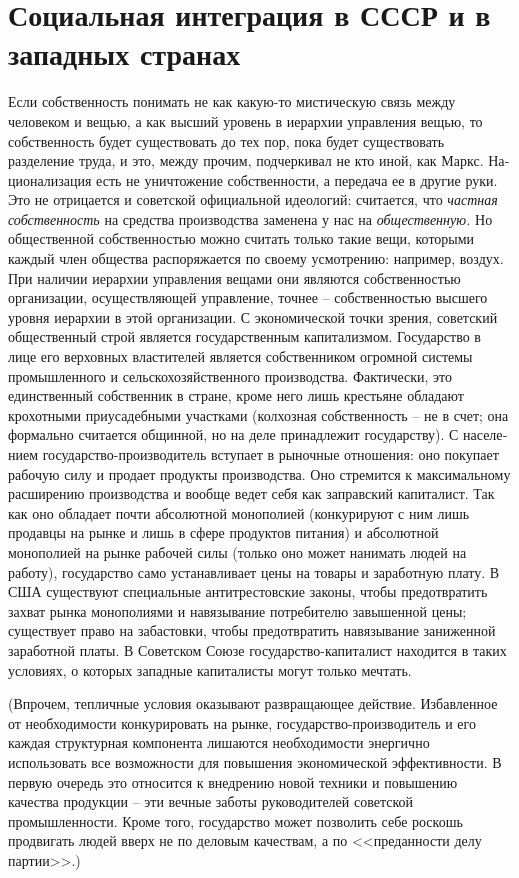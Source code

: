 \documentclass{book}
\begin{document}
\section{Социальная интеграция в СССР и в западных странах}

Если собственность понимать не как какую-то мистическую связь между человеком и вещью, а как высший уровень в ие­рархии управления вещью, то собственность будет существо­вать до тех пор, пока будет существовать разделение труда, и это, между прочим, подчеркивал не кто иной, как Маркс. На­ционализация есть не уничтожение собственности, а передача ее в другие руки. Это не отрицается и советской официальной идеологий: считается, что \textit{частная собственность}  на средства производства заменена у нас на \textit{общественную.}  Но общественной собственностью можно считать только такие вещи, кото­рыми каждый член общества распоряжается по своему усмот­рению: например, воздух. При наличии иерархии управления вещами они являются собственностью организации, осущест­вляющей управление, точнее -- собственностью высшего уров­ня иерархии в этой организации. С экономической точки зре­ния, советский общественный строй является государственным капитализмом. Государство в лице его верховных властите­лей является 
собственником огромной 
системы промышлен­ного и сельскохозяйственного производства. Фактически, это единственный собственник в стране, кроме него лишь кре­стьяне обладают крохотными приусадебными участками (кол­хозная собственность -- не в счет; она формально считается общинной, но на деле принадлежит государству). С населе­нием государство-производитель вступает в рыночные отно­шения: оно покупает рабочую силу и продает продукты произ­водства. Оно стремится к максимальному расширению произ­водства и вообще ведет себя как заправский капиталист. Так как оно обладает почти абсолютной монополией (конкурируют с ним лишь продавцы на рынке и лишь в сфере продуктов пи­тания) и абсолютной монополией на рынке рабочей силы (толь­ко оно может нанимать людей на работу), государство само устанавливает цены на товары и заработную плату. В США су­ществуют специальные антитрестовские законы, чтобы предот­вратить захват рынка монополиями и навязывание потребите­лю завышенной цены; существует право на забастовки, чтобы предотвратить навязывание 
заниженной заработной платы. В Советском Союзе государство-капиталист находится в таких условиях, о которых западные капиталисты могут только мечтать.

(Впрочем, тепличные условия оказывают развращающее действие. Избавленное от необходимости конкурировать на рынке, государство-производитель и его каждая структурная компонента лишаются необходимости энергично использовать все возможности для повышения экономической эффективности. В первую очередь это относится к внедрению новой техники и повышению качества продукции -- эти вечные заботы руководителей советской промышленности. Кроме того, государство может позволить себе роскошь продвигать людей вверх не по деловым качествам, а по <<преданности делу партии>>.)
\end{document}
